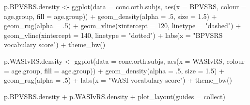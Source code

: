 \documentclass[
  letterpaper,
  DIV=11,
  numbers=noendperiod]{scrreprt}
\newenvironment{Shaded}{\begin{snugshade}}{\end{snugshade}}
\newcommand{\AttributeTok}[1]{\textcolor[rgb]{0.40,0.45,0.13}{#1}}
\newcommand{\DecValTok}[1]{\textcolor[rgb]{0.68,0.00,0.00}{#1}}
\newcommand{\FloatTok}[1]{\textcolor[rgb]{0.68,0.00,0.00}{#1}}
\newcommand{\FunctionTok}[1]{\textcolor[rgb]{0.28,0.35,0.67}{#1}}
\newcommand{\NormalTok}[1]{\textcolor[rgb]{0.00,0.23,0.31}{#1}}
\newcommand{\OtherTok}[1]{\textcolor[rgb]{0.00,0.23,0.31}{#1}}
\newcommand{\SpecialCharTok}[1]{\textcolor[rgb]{0.37,0.37,0.37}{#1}}
\newcommand{\StringTok}[1]{\textcolor[rgb]{0.13,0.47,0.30}{#1}}
\begin{document}
\begin{Shaded}
\begin{Highlighting}[numbers=left,,]
\NormalTok{p.BPVSRS.density }\OtherTok{\textless{}{-}} \FunctionTok{ggplot}\NormalTok{(}\AttributeTok{data =}\NormalTok{ conc.orth.subjs, }\FunctionTok{aes}\NormalTok{(}\AttributeTok{x =}\NormalTok{ BPVSRS, }\AttributeTok{colour =}\NormalTok{ age.group, }\AttributeTok{fill =}\NormalTok{ age.group)) }\SpecialCharTok{+}
  \FunctionTok{geom\_density}\NormalTok{(}\AttributeTok{alpha =}\NormalTok{ .}\DecValTok{5}\NormalTok{, }\AttributeTok{size =} \FloatTok{1.5}\NormalTok{) }\SpecialCharTok{+}
  \FunctionTok{geom\_rug}\NormalTok{(}\AttributeTok{alpha =}\NormalTok{ .}\DecValTok{5}\NormalTok{) }\SpecialCharTok{+}
  \FunctionTok{geom\_vline}\NormalTok{(}\AttributeTok{xintercept =} \DecValTok{120}\NormalTok{, }\AttributeTok{linetype =} \StringTok{"dashed"}\NormalTok{) }\SpecialCharTok{+}
  \FunctionTok{geom\_vline}\NormalTok{(}\AttributeTok{xintercept =} \DecValTok{140}\NormalTok{, }\AttributeTok{linetype =} \StringTok{"dotted"}\NormalTok{) }\SpecialCharTok{+}
  \FunctionTok{labs}\NormalTok{(}\AttributeTok{x =} \StringTok{"BPVSRS vocabulary score"}\NormalTok{) }\SpecialCharTok{+}
  \FunctionTok{theme\_bw}\NormalTok{()}

\NormalTok{p.WASIvRS.density }\OtherTok{\textless{}{-}} \FunctionTok{ggplot}\NormalTok{(}\AttributeTok{data =}\NormalTok{ conc.orth.subjs, }\FunctionTok{aes}\NormalTok{(}\AttributeTok{x =}\NormalTok{ WASIvRS, }\AttributeTok{colour =}\NormalTok{ age.group, }\AttributeTok{fill =}\NormalTok{ age.group)) }\SpecialCharTok{+}
  \FunctionTok{geom\_density}\NormalTok{(}\AttributeTok{alpha =}\NormalTok{ .}\DecValTok{5}\NormalTok{, }\AttributeTok{size =} \FloatTok{1.5}\NormalTok{) }\SpecialCharTok{+}
  \FunctionTok{geom\_rug}\NormalTok{(}\AttributeTok{alpha =}\NormalTok{ .}\DecValTok{5}\NormalTok{) }\SpecialCharTok{+}
  \FunctionTok{labs}\NormalTok{(}\AttributeTok{x =} \StringTok{"WASI vocabulary score"}\NormalTok{) }\SpecialCharTok{+}
  \FunctionTok{theme\_bw}\NormalTok{()}

\NormalTok{p.BPVSRS.density }\SpecialCharTok{+}\NormalTok{ p.WASIvRS.density }\SpecialCharTok{+} \FunctionTok{plot\_layout}\NormalTok{(}\AttributeTok{guides =} \StringTok{\textquotesingle{}collect\textquotesingle{}}\NormalTok{)}
\end{Highlighting}
\end{Shaded}
\end{document}
